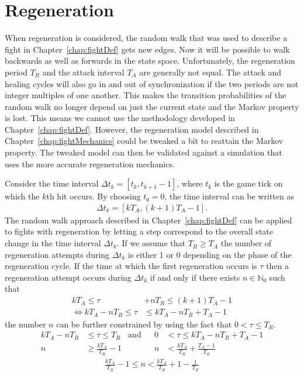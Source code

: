 \section{Regeneration}\label{chap:regen}
When regeneration is considered, the random walk that was used to describe a fight in Chapter~\ref{chap:fightDef} gets new edges. Now it will be possible to walk backwards as well as forwards in the state space. Unfortunately, the regeneration period $T_R$ and the attack interval $T_A$ are generally not equal. The attack and healing cycles will also go in and out of synchronization if the two periods are not integer multiples of one another. This makes the transition probabilities of the random walk no longer depend on just the current state and the Markov property is lost. This means we cannot use the methodology developed in Chapter~\ref{chap:fightDef}. However, the regeneration model described in Chapter~\ref{chap:fightMechanics} could be tweaked a bit to reattain the Markov property. The tweaked model can then be validated against a simulation that uses the more accurate regeneration mechanics.

Consider the time interval $\Delta t_k = [t_k, t_{k+1}-1]$, where $t_k$ is the game tick on which the $k$th hit occurs. By choosing $t_0 = 0$, the time interval can be written as
\begin{align}
	\Delta t_k = [kT_A, (k+1)T_A - 1].
\end{align}
The random walk approach described in Chapter~\ref{chap:fightDef} can be applied to fights with regeneration by letting a step correspond to the overall state change in the time interval $\Delta t_k$. If we assume that $T_R \geq T_A$ the number of regeneration attempts during $\Delta t_k$ is either 1 or 0 depending on the phase of the regeneration cycle. If the time at which the first regeneration occurs is $\tau$ then a regeneration attempt occurs during $\Delta t_k$ if and only if there exists $n \in \mathbb{N}_0$ such that
\begin{align}
	kT_A \leq \tau& + nT_R \leq (k+1)T_A - 1\\
	\iff kT_A - nT_R \leq \tau& \leq kT_A - nT_R + T_A - 1
\end{align}
the number $n$ can be further constrained by using the fact that $0 < \tau \leq T_R$.
\begin{align}
	kT_A - nT_R &\leq \tau \leq T_R &\mbox{and}& &0 &< \tau \leq kT_A - nT_R + T_A - 1\\
	n &\geq \frac{kT_A}{T_R} - 1 && &n &< \frac{kT_A}{T_R} + \frac{T_A - 1}{T_R}
\end{align}
\begin{align}
	\frac{kT_A}{T_R} - 1 \leq n < \frac{kT_A}{T_R} + 1 - \frac{1}{T_R}
\end{align}

